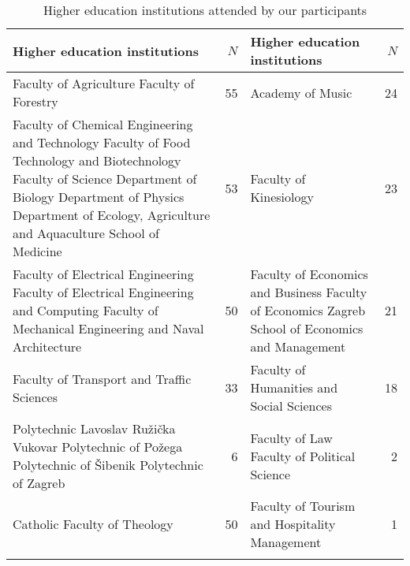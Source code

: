 \begin{table}[t]
\small
\caption{Higher education institutions attended by our participants\label{T16.6}}
\begin{tabularx}{\textwidth}{XrXr} %
\lsptoprule
Higher education institutions& $N$ & Higher education institutions & $N$\\
\midrule
Faculty of Agriculture \newline Faculty of Forestry & 55 & Academy of Music & 24\\
\tablevspace
Faculty of Chemical Engineering \newline and Technology \newline Faculty of Food Technology \newline and Biotechnology \newline Faculty of Science \newline Department of Biology \newline Department of Physics \newline Department of Ecology, Agriculture \newline and Aquaculture \newline School of Medicine & 53 & Faculty of Kinesiology& 23 \\
\tablevspace
Faculty of Electrical Engineering \newline Faculty of Electrical Engineering \newline and Computing \newline Faculty of Mechanical Engineering \newline and Naval Architecture& 50& Faculty of Economics and Business \newline Faculty of Economics \newline Zagreb School of Economics \newline and Management & 21 \\
\tablevspace
Faculty of Transport and Traffic Sciences& 33 & Faculty of Humanities and Social Sciences & 18 \\
\tablevspace
Polytechnic Lavoslav Ružička Vukovar \newline Polytechnic of Požega \newline Polytechnic of Šibenik \newline Polytechnic of Zagreb & 6 & Faculty of Law \newline Faculty of Political Science & 2 \\
\tablevspace
Catholic Faculty of Theology & 50 & Faculty of Tourism and \newline Hospitality Management & 1 \\
\lspbottomrule
\end{tabularx}
\end{table}


